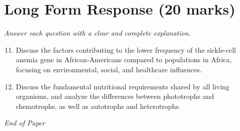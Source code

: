 \documentclass[12pt]{article}
\begin{document}
\section*{Long Form Response (20 marks)}
\textit{Answer each question with a clear and complete explanation.}
\begin{enumerate}[label=\arabic*.]
\setcounter{enumi}{10}
\item Discuss the factors contributing to the lower frequency of the sickle-cell anemia gene in African-Americans compared to populations in Africa, focusing on environmental, social, and healthcare influences.
\item Discuss the fundamental nutritional requirements shared by all living organisms, and analyze the differences between phototrophs and chemotrophs, as well as autotrophs and heterotrophs.
\end{enumerate}

\vfill
\noindent\textit{End of Paper}
\end{document}
